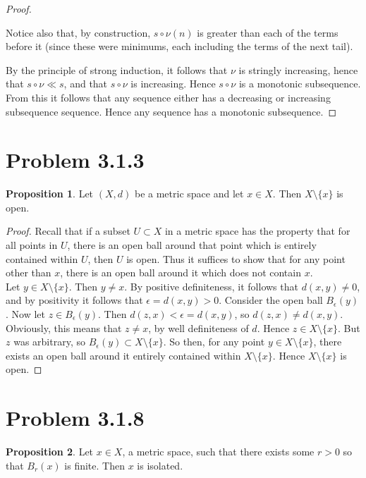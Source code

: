 \documentclass[11pt]{article}
\theoremstyle{definition}
\newtheorem{proposition}{Proposition}
\begin{document}
\begin{proof}
\begin{itemize}
Notice also that, by construction, $s\circ \nu(n)$ is greater than each of the terms before it (since these were minimums, each including the terms of the next tail).
\end{itemize}
By the principle of strong induction, it follows that $\nu$ is stringly increasing, hence that $s\circ\nu\ll s$, and that $s\circ \nu$ is increasing. Hence $s\circ \nu$ is a monotonic subsequence. \\

From this it follows that any sequence either has a decreasing or increasing subsequence sequence. Hence any sequence has a monotonic subsequence.
\end{proof}

\section{Problem 3.1.3}

\begin{proposition}
Let $(X,d)$ be a metric space and let $x\in X$. Then $X\setminus \{x\}$ is open. 
\end{proposition}

\begin{proof}
Recall that if a subset $U\subset X$ in a metric space has the property that for all points in $U$, there is an open ball around that point which is entirely contained within $U$, then $U$ is open. Thus it suffices to show that for any point other than $x$, there is an open ball around it which does not contain $x$.\\

Let $y\in X\setminus \{x\}$. Then $y\ne x$. By positive definiteness, it follows that $d(x,y) \ne 0$, and by positivity it follows that $\epsilon = d(x,y)>0$. Consider the open ball $B_\epsilon(y)$. Now let $z\in B_\epsilon(y)$. Then $d(z,x)< \epsilon = d(x,y)$, so $d(z,x) \ne d(x,y)$. Obviously, this means that $z\ne x$, by well definiteness of $d$. Hence $z\in X\setminus \{x\}$. But $z$ was arbitrary, so $B_\epsilon(y)\subset X\setminus \{x\}$. So then, for any point $y\in X\setminus\{x\}$, there exists an open ball around it entirely contained within $X\setminus\{x\}$. Hence $ X\setminus\{x\} $ is open.
\end{proof}

\section{Problem 3.1.8}

\begin{proposition}
Let $x\in X$, a metric space, such that there exists some $r>0$ so that $B_r(x)$ is finite. Then $x$ is isolated. 

\end{proposition}
\end{document}
